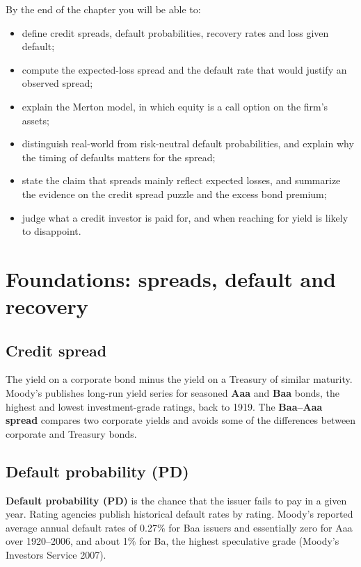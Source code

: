 By the end of the chapter you will be able to:

\begin{itemize}
  \item define credit spreads, default probabilities, recovery rates and loss given default;
  \item compute the expected-loss spread and the default rate that would justify an observed spread;
  \item explain the Merton model, in which equity is a call option on the firm's assets;
  \item distinguish real-world from risk-neutral default probabilities, and explain why the timing of defaults matters for the spread;
  \item state the claim that spreads mainly reflect expected losses, and summarize the evidence on the credit spread puzzle and the excess bond premium;
  \item judge what a credit investor is paid for, and when reaching for yield is likely to disappoint.
\end{itemize}

\section{Foundations: spreads, default and recovery}
\label{sec:18-foundations}

\subsection{Credit spread}

The yield on a corporate bond minus the yield on a Treasury of similar maturity. Moody's publishes long-run yield series for seasoned \textbf{Aaa} and \textbf{Baa} bonds, the highest and lowest investment-grade ratings, back to 1919. The \textbf{Baa--Aaa spread} compares two corporate yields and avoids some of the differences between corporate and Treasury bonds.

\subsection{Default probability (PD)}

\textbf{Default probability (PD)} is the chance that the issuer fails to pay in a given year. Rating agencies publish historical default rates by rating. Moody's reported average annual default rates of 0.27\% for Baa issuers and essentially zero for Aaa over 1920--2006, and about 1\% for Ba, the highest speculative grade (Moody's Investors Service 2007).

